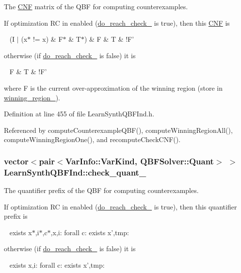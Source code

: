 The \hyperlink{classCNF}{C\-N\-F} matrix of the Q\-B\-F for computing counterexamples. 

If optimization R\-C in enabled (\hyperlink{classLearnSynthQBFInd_af87e4a2c1d17c4c5bc398082d6d3e365}{do\-\_\-reach\-\_\-check\-\_\-} is true), then this \hyperlink{classCNF}{C\-N\-F} is \par
 ~ (I $\vert$ (x$\ast$ != x) \& F$\ast$ \& T$\ast$) \& F \& T \& !\-F' \par
 otherwise (if \hyperlink{classLearnSynthQBFInd_af87e4a2c1d17c4c5bc398082d6d3e365}{do\-\_\-reach\-\_\-check\-\_\-} is false) it is \par
 ~ F \& T \& !\-F' \par
 where F is the current over-\/approximation of the winning region (store in \hyperlink{classLearnSynthQBFInd_ab8ce6031137413e90e0626bbdc734be0}{winning\-\_\-region\-\_\-}). 

Definition at line 455 of file Learn\-Synth\-Q\-B\-F\-Ind.\-h.



Referenced by compute\-Counterexample\-Q\-B\-F(), compute\-Winning\-Region\-All(), compute\-Winning\-Region\-One(), and recompute\-Check\-C\-N\-F().

\hypertarget{classLearnSynthQBFInd_ab9287e0b57dbf85dab6e7f7caf30cd13}{
\subsubsection[{check\-\_\-quant\-\_\-}]{\setlength{\rightskip}{0pt plus 5cm}vector$<$pair$<${\bf Var\-Info\-::\-Var\-Kind}, {\bf Q\-B\-F\-Solver\-::\-Quant}$>$ $>$ Learn\-Synth\-Q\-B\-F\-Ind\-::check\-\_\-quant\-\_\-\hspace{0.3cm}{\ttfamily [protected]}}}\label{classLearnSynthQBFInd_ab9287e0b57dbf85dab6e7f7caf30cd13}


The quantifier prefix of the Q\-B\-F for computing counterexamples. 

If optimization R\-C in enabled (\hyperlink{classLearnSynthQBFInd_af87e4a2c1d17c4c5bc398082d6d3e365}{do\-\_\-reach\-\_\-check\-\_\-} is true), then this quantifier prefix is \par
 ~ exists x$\ast$,i$\ast$,c$\ast$,x,i\-: forall c\-: exists x',tmp\-: \par
 otherwise (if \hyperlink{classLearnSynthQBFInd_af87e4a2c1d17c4c5bc398082d6d3e365}{do\-\_\-reach\-\_\-check\-\_\-} is false) it is \par
 ~ exists x,i\-: forall c\-: exists x',tmp\-: \par
 

